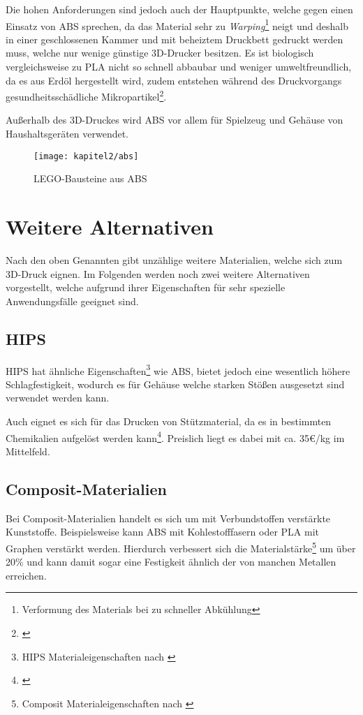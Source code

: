 Die hohen Anforderungen sind jedoch auch der Hauptpunkte, welche gegen einen Einsatz von \ac{ABS} sprechen, da das Material sehr zu \textit{Warping}\footnote{Verformung des Materials bei zu schneller Abkühlung} neigt und deshalb in einer geschlossenen Kammer und mit beheiztem Druckbett gedruckt werden muss, welche nur wenige günstige 3D-Drucker besitzen. Es ist biologisch vergleichsweise zu \ac{PLA} nicht so schnell abbaubar und weniger umweltfreundlich, da es aus Erdöl hergestellt wird, zudem entstehen während des Druckvorgangs gesundheitsschädliche Mikropartikel\footnote{\cite{Azimi2016}}.

Außerhalb des 3D-Druckes wird \ac{ABS} vor allem für Spielzeug und Gehäuse von Haushaltsgeräten verwendet.

\begin{figure}[h]
  \centering
  \texttt{[image: kapitel2/abs]}
  \caption{LEGO-Bausteine aus ABS}
  \label{Kap2:ABSLego}
\end{figure}

\section{Weitere Alternativen}

Nach den oben Genannten gibt unzählige weitere Materialien, welche sich zum 3D-Druck eignen. Im Folgenden werden noch zwei weitere Alternativen vorgestellt, welche aufgrund ihrer Eigenschaften für sehr spezielle Anwendungsfälle geeignet sind.

\subsection{HIPS}
\ac{HIPS} hat ähnliche Eigenschaften\footnote{HIPS Materialeigenschaften nach \cite{ZHIPS2016}} wie \ac{ABS}, bietet jedoch eine wesentlich höhere Schlagfestigkeit, wodurch es \zb für Gehäuse welche starken Stößen ausgesetzt sind verwendet werden kann.

Auch eignet es sich für das Drucken von Stützmaterial, da es in bestimmten Chemikalien aufgelöst werden kann\footnote{\cite{Hearon2013}}. Preislich liegt es dabei mit ca. 35€/kg im Mittelfeld.

\subsection{Composit-Materialien}
Bei Composit-Materialien handelt es sich um mit Verbundstoffen verstärkte Kunststoffe. Beispielsweise kann \ac{ABS} mit Kohlestofffasern oder \ac{PLA} mit Graphen verstärkt werden. Hierdurch verbessert sich die Materialstärke\footnote{Composit Materialeigenschaften nach \cite{Zhenyu2016}} um über 20\% und kann damit sogar eine Festigkeit ähnlich der von manchen Metallen erreichen.


